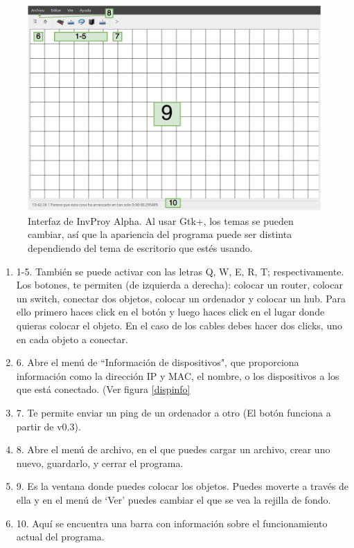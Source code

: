 \documentclass[a4paper, 11pt]{report} %
\begin{document}
\begin{figure}[H]
\noindent\centering
\includegraphics[width=\textwidth]{Resources/Screenshots/2016-09-07-134612_1000x700_scrot.png}
\caption[Interfaz de InvProy Alpha]{Interfaz de InvProy Alpha. Al usar Gtk+, los temas se pueden cambiar, así que la apariencia del programa puede ser distinta dependiendo del tema de escritorio que estés usando.}
\end{figure}
\newenvironment{mydescr}
{ \begin{enumerate}
    \setlength{\itemsep}{0pt}
    \setlength{\parskip}{0pt}
    \setlength{\parsep}{0pt}     }
{ \end{enumerate}                  } 
\begin{mydescr}
\item [1-5.] También se puede activar con las letras Q, W, E, R, T; respectivamente. Los botones, te permiten (de izquierda a derecha): colocar un router, colocar un switch, conectar dos objetos, colocar un ordenador y colocar un hub. Para ello primero haces click en el botón y luego haces click en el lugar donde quieras colocar el objeto. En el caso de los cables debes hacer dos clicks, uno en cada objeto a conectar. 
\item [6.] Abre el menú de ``Información de dispositivos", que proporciona información como la dirección IP y MAC, el nombre, o los dispositivos a los que está conectado. (Ver figura \ref{dispinfo}
\item [7.] Te permite enviar un ping de un ordenador a otro (El botón funciona a partir de v0.3).
\item [8.] Abre el menú de archivo, en el que puedes cargar un archivo, crear uno nuevo, guardarlo, y cerrar el programa.
\item [9.] Es la ventana donde puedes colocar los objetos. Puedes moverte a través de ella y en el menú de `Ver' puedes cambiar el que se vea la rejilla de fondo.
\item [10.] Aquí se encuentra una barra con información sobre el funcionamiento actual del programa.
\end{mydescr}
\end{document}
